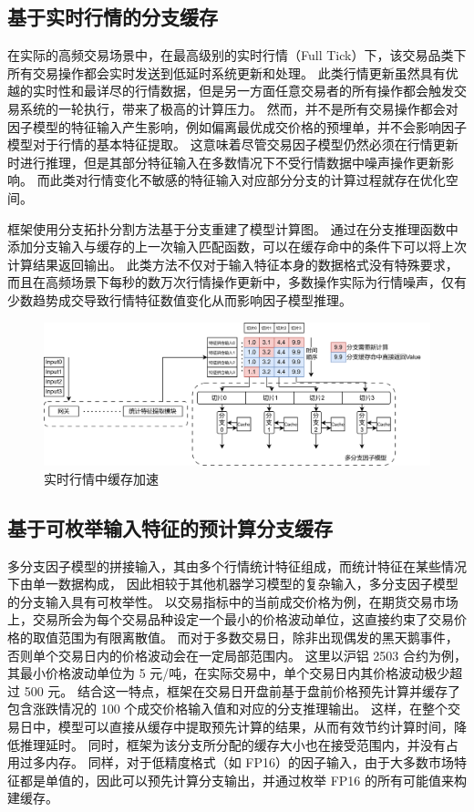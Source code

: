 \subsection{基于实时行情的分支缓存}

在实际的高频交易场景中，在最高级别的实时行情（Full Tick）下，该交易品类下所有交易操作都会实时发送到低延时系统更新和处理。
此类行情更新虽然具有优越的实时性和最详尽的行情数据，但是另一方面任意交易者的所有操作都会触发交易系统的一轮执行，带来了极高的计算压力。
然而，并不是所有交易操作都会对因子模型的特征输入产生影响，例如偏离最优成交价格的预埋单，并不会影响因子模型对于行情的基本特征提取。
这意味着尽管交易因子模型仍然必须在行情更新时进行推理，但是其部分特征输入在多数情况下不受行情数据中噪声操作更新影响。
而此类对行情变化不敏感的特征输入对应部分分支的计算过程就存在优化空间。

框架使用分支拓扑分割方法基于分支重建了模型计算图。
通过在分支推理函数中添加分支输入与缓存的上一次输入匹配函数，可以在缓存命中的条件下可以将上次计算结果返回输出。
此类方法不仅对于输入特征本身的数据格式没有特殊要求，
而且在高频场景下每秒的数万次行情操作更新中，多数操作实际为行情噪声，仅有少数趋势成交导致行情特征数值变化从而影响因子模型推理。
\begin{figure}[h]
    \centering
    \includegraphics[width=1\textwidth]{image/chap03/high.png}
    \caption{实时行情中缓存加速}
    \label{fig:hole1}
\end{figure}

\subsection{基于可枚举输入特征的预计算分支缓存}

多分支因子模型的拼接输入，其由多个行情统计特征组成，而统计特征在某些情况下由单一数据构成，
因此相较于其他机器学习模型的复杂输入，多分支因子模型的分支输入具有可枚举性。
以交易指标中的当前成交价格为例，在期货交易市场上，交易所会为每个交易品种设定一个最小的价格波动单位，这直接约束了交易价格的取值范围为有限离散值。
而对于多数交易日，除非出现偶发的黑天鹅事件，否则单个交易日内的价格波动会在一定局部范围内。
这里以沪铝 2503 合约为例，其最小价格波动单位为 5 元/吨，在实际交易中，单个交易日内其价格波动极少超过 500 元。
结合这一特点，框架在交易日开盘前基于盘前价格预先计算并缓存了包含涨跌情况的 100 个成交价格输入值和对应的分支推理输出。
这样，在整个交易日中，模型可以直接从缓存中提取预先计算的结果，从而有效节约计算时间，降低推理延时。
同时，框架为该分支所分配的缓存大小也在接受范围内，并没有占用过多内存。
同样，对于低精度格式（如 FP16）的因子输入，由于大多数市场特征都是单值的，因此可以预先计算分支输出，并通过枚举 FP16 的所有可能值来构建缓存。

